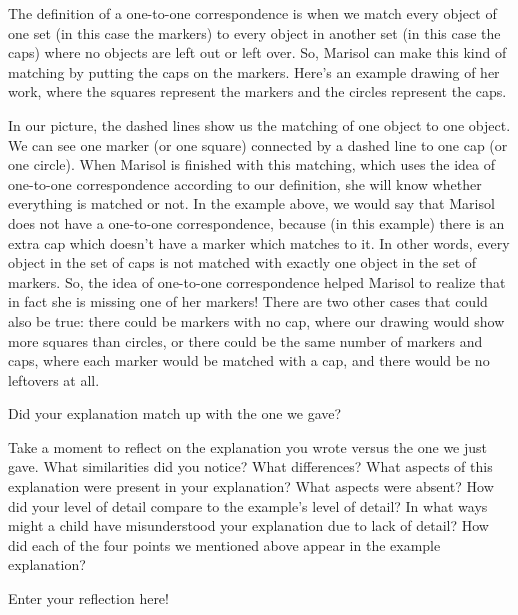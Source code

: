 \documentclass[noauthor,nooutcomes]{ximera}
\begin{document}
\begin{problem}
\begin{problem}
The definition of a one-to-one correspondence is when we match every object of one set (in this case the markers) to every object in another set (in this case the caps) where no objects are left out or left over. So, Marisol can make this kind of matching by putting the caps on the markers. Here's an example drawing of her work, where the squares represent the markers and the circles represent the caps.
\begin{center}
\end{center}
In our picture, the dashed lines show us the matching of one object to one object. We can see one marker (or one square) connected by a dashed line to one cap (or one circle). When Marisol is finished with this matching, which uses the idea of one-to-one correspondence according to our definition, she will know whether everything is matched or not. In the example above, we would say that Marisol does not have a one-to-one correspondence, because (in this example) there is an extra cap which doesn't have a marker which matches to it. In other words, every object in the set of caps is not matched with exactly one object in the set of markers. So, the idea of one-to-one correspondence helped Marisol to realize that in fact she is missing one of her markers! There are two other cases that could also be true: there could be markers with no cap, where our drawing would show more squares than circles, or there could be the same number of markers and caps, where each marker would be matched with a cap, and there would be no leftovers at all.

\begin{prompt}
	Did your explanation match up with the one we gave?
	\begin{multipleChoice}
	\end{multipleChoice}
\end{prompt}
\end{problem}
\end{problem}

Take a moment to reflect on the explanation you wrote versus the one we just gave. What similarities did you notice? What differences? What aspects of this explanation were present in your explanation? What aspects were absent? How did your level of detail compare to the example's level of detail? In what ways might a child have misunderstood your explanation due to lack of detail? How did each of the four points we mentioned above appear in the example explanation?
\begin{freeResponse}
	Enter your reflection here!
\end{freeResponse}
\end{document}
